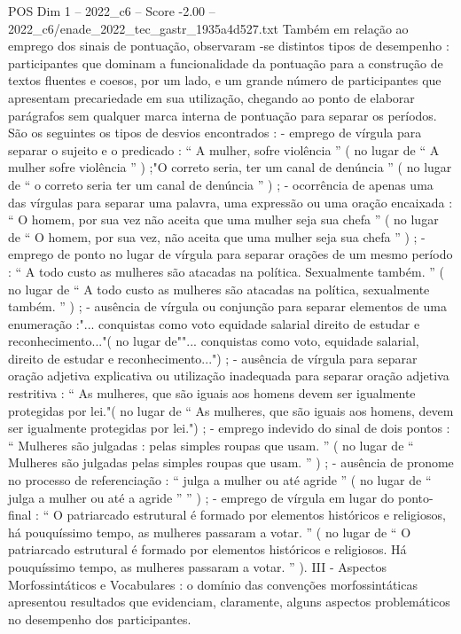 \begin{textsample}{POS Dim 1 – 2022\_c6 – Score -2.00 – 2022\_c6/enade\_2022\_tec\_gastr\_1935a4d527.txt}
Também em relação ao emprego dos sinais de pontuação, observaram -se distintos tipos de desempenho : participantes que dominam a funcionalidade da pontuação para a construção de textos fluentes e coesos, por um lado, e um grande número de participantes que apresentam precariedade em sua utilização, chegando ao ponto de elaborar parágrafos sem qualquer marca interna de pontuação para separar os períodos.
São os seguintes os tipos de desvios encontrados : - emprego de vírgula para separar o sujeito e o predicado : “ A mulher, sofre violência ” ( no lugar de “ A mulher sofre violência ” ) ;"O correto seria, ter um canal de denúncia ” ( no lugar de “ o correto seria ter um canal de denúncia ” ) ; - ocorrência de apenas uma das vírgulas para separar uma palavra, uma expressão ou uma oração encaixada : “ O homem, por sua vez não aceita que uma mulher seja sua chefa ” ( no lugar de “ O homem, por sua vez, não aceita que uma mulher seja sua chefa ” ) ; - emprego de ponto no lugar de vírgula para separar orações de um mesmo período : “ A todo custo as mulheres são atacadas na política.
Sexualmente também. ” ( no lugar de “ A todo custo as mulheres são atacadas na política, sexualmente também. ” ) ; - ausência de vírgula ou conjunção para separar elementos de uma enumeração :"... conquistas como voto equidade salarial direito de estudar e reconhecimento..."( no lugar de""... conquistas como voto, equidade salarial, direito de estudar e reconhecimento...") ; - ausência de vírgula para separar oração adjetiva explicativa ou utilização inadequada para separar oração adjetiva restritiva : “ As mulheres, que são iguais aos homens devem ser igualmente protegidas por lei."( no lugar de “ As mulheres, que são iguais aos homens, devem ser igualmente protegidas por lei.") ; - emprego indevido do sinal de dois pontos : “ Mulheres são julgadas : pelas simples roupas que usam. ” ( no lugar de “ Mulheres são julgadas pelas simples roupas que usam. ” ) ; - ausência de pronome no processo de referenciação : “ julga a mulher ou até agride ” ( no lugar de “ julga a mulher ou até a agride ” ” ) ; - emprego de vírgula em lugar do ponto-final : “ O patriarcado estrutural é formado por elementos históricos e religiosos, há pouquíssimo tempo, as mulheres passaram a votar. ” ( no lugar de “ O patriarcado estrutural é formado por elementos históricos e religiosos.
Há pouquíssimo tempo, as mulheres passaram a votar. ” ).
III - Aspectos Morfossintáticos e Vocabulares : o domínio das convenções morfossintáticas apresentou resultados que evidenciam, claramente, alguns aspectos problemáticos no desempenho dos participantes.

\end{textsample}
